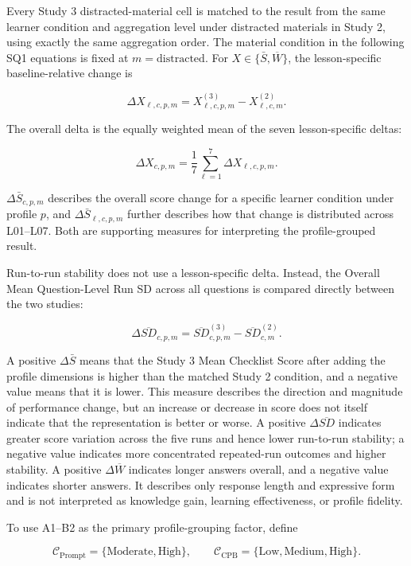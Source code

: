 Every Study 3 distracted-material cell is matched to the result from the same learner condition and aggregation level under distracted materials in Study 2, using exactly the same aggregation order. The material condition in the following SQ1 equations is fixed at $m=\mathrm{distracted}$. For $X\in\{\bar S,\overline W\}$, the lesson-specific baseline-relative change is

\[
\Delta X_{\ell,c,p,m}
=
X^{(3)}_{\ell,c,p,m}
-
X^{(2)}_{\ell,c,m}.
\]

The overall delta is the equally weighted mean of the seven lesson-specific deltas:

\[
\Delta X_{c,p,m}
=
\frac{1}{7}
\sum_{\ell=1}^{7}
\Delta X_{\ell,c,p,m}.
\]

$\Delta\bar S_{c,p,m}$ describes the overall score change for a specific learner condition under profile $p$, and $\Delta\bar S_{\ell,c,p,m}$ further describes how that change is distributed across L01--L07. Both are supporting measures for interpreting the profile-grouped result.

Run-to-run stability does not use a lesson-specific delta. Instead, the Overall Mean Question-Level Run SD across all questions is compared directly between the two studies:

\[
\Delta\overline{SD}_{c,p,m}
=
\overline{SD}^{(3)}_{c,p,m}
-
\overline{SD}^{(2)}_{c,m}.
\]

A positive $\Delta\bar S$ means that the Study 3 Mean Checklist Score after adding the profile dimensions is higher than the matched Study 2 condition, and a negative value means that it is lower. This measure describes the direction and magnitude of performance change, but an increase or decrease in score does not itself indicate that the representation is better or worse. A positive $\Delta\overline{SD}$ indicates greater score variation across the five runs and hence lower run-to-run stability; a negative value indicates more concentrated repeated-run outcomes and higher stability. A positive $\Delta\overline W$ indicates longer answers overall, and a negative value indicates shorter answers. It describes only response length and expressive form and is not interpreted as knowledge gain, learning effectiveness, or profile fidelity.

To use A1--B2 as the primary profile-grouping factor, define

\[
\mathcal C_{\mathrm{Prompt}}
=
\{\mathrm{Moderate},\mathrm{High}\},
\qquad
\mathcal C_{\mathrm{CPB}}
=
\{\mathrm{Low},\mathrm{Medium},\mathrm{High}\}.
\]

